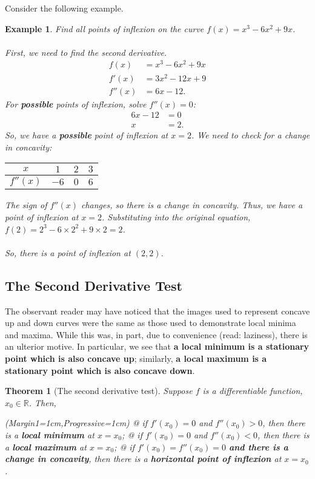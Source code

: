 \documentclass[a4paper,11pt]{article}
\newcommand{\R}{\mathbb{R}}
\newtheorem*{theorem*}{Theorem}
\newtheorem{example}{Example}
\begin{document}
\noindent Consider the following example.
\pagebreak
\begin{example}
	\normalfont
	Find all points of inflexion on the curve $f(x)=x^3-6x^2+9x$.\\\\
	First, we need to find the second derivative.
	\begin{align*}
	f(x) &= x^3-6x^2+9x\\
	f'(x) &= 3x^2-12x+9\\
	f''(x) &= 6x-12.
	\end{align*}
	For \textbf{possible} points of inflexion, solve $f''(x)=0$:
	\begin{align*}
	6x-12 &= 0\\
	x &= 2.
	\end{align*}
	So, we have a \textbf{possible} point of inflexion at $x=2$. We need to check for a change in concavity: 
	{\renewcommand{\arraystretch}{1.5}%
		\begin{table}[H]\centering
			\begin{tabular}{c|c|c|c}
				  $x$    & $1$  & $2$ & $3$ \\ \hline
				$f''(x)$ & $-6$ & $0$ & $6$
			\end{tabular}
	\end{table}}
	The sign of $f''(x)$ changes, so there is a change in concavity. Thus, we have a point of inflexion at $x=2$. Substituting into the original equation, $f(2) = 2^3-6\times2^2+9\times2 = 2$.\\\\
	So, there is a point of inflexion at $(2,2)$.
\end{example}

\subsection*{The Second Derivative Test}
The observant reader may have noticed that the images used to represent concave up and down curves were the same as those used to demonstrate local minima and maxima. While this was, in part, due to convenience (read: laziness), there is an ulterior motive. In particular, we see that \textbf{a local minimum is a stationary point which is also concave up}; similarly, \textbf{a local maximum is a stationary point which is also concave down}. 

\begin{theorem*}[The second derivative test]
	Suppose $f$ is a differentiable function, $x_0\in\R$. Then, 
	\vspace{0.15cm}
	\begin{easylist}[itemize]
		\ListProperties(Margin1=1cm,Progressive=1cm)
		@ if $f'(x_0)=0$ and $f''(x_0)>0$, then there is a \textbf{local minimum} at $x=x_0$;
		@ if $f'(x_0)=0$ and $f''(x_0)<0$, then there is a \textbf{local maximum} at $x=x_0$;
		@ if $f'(x_0)=f''(x_0)=0$ \textbf{and there is a change in concavity}, then there is a \textbf{horizontal point of inflexion} at $x=x_0$.
	\end{easylist}
	\vspace{0.15cm}
\end{theorem*}
\end{document}
